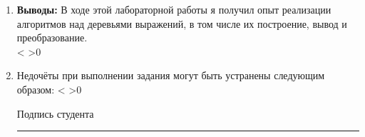 \documentclass[a4paper]{article}
\makeatletter
\newcounter{i}
\newcommand{\PrintEmptyLines}[1]{\setcounter{i}{1}\@whilenum\value{i}<#1\do{\stepcounter{i}\EmptyLine\\} \ifnum #1>0 {\EmptyLine}\fi}
\newcommand\arulefill[1]{{\expandafter \ulined #1 \hfill}}
\newcommand{\EmptyLine}{\null\arulefill{}}
\newcommand{\mrule}[1]{\rule[-2.8pt]{#1}{.4pt}}
\newcounter{EmptyLines1}
\newcounter{EmptyLines2}
\newcounter{EmptyLines3}
\newcounter{EmptyLines10}
\newcounter{EmptyLines11}
\newcounter{EmptyLines12}
\newcommand{\Textx}{}  %
\newcommand{\Textxi}{
}  %
\makeatother
\begin{document}
\begin{enumerate}[label=\textbf{\arabic*}.]
\item \textbf{Выводы:} \arulefill{\footnotesize В ходе этой лабораторной работы я получил опыт реализации алгоритмов над деревьями выражений, в том числе их построение, вывод и преобразование.} \Textxi \\
\PrintEmptyLines{\value{EmptyLines2}}\\


\item Недочёты при выполнении задания могут быть устранены следующим образом: {\footnotesize} \arulefill{\Textx}
\PrintEmptyLines{\value{EmptyLines2}}\\

 \begin{flushright}
Подпись студента \mrule{4cm}
\end{flushright}

\end{enumerate}
\end{document}
